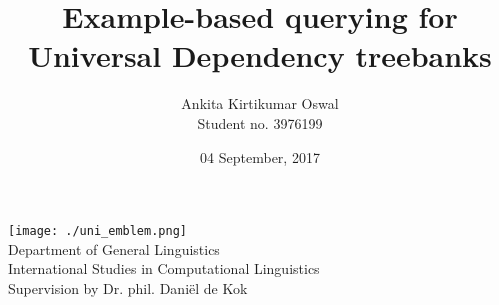 \documentclass[]{scrartcl}
\theoremstyle{exmp}
\begin{document}
\setlength{\parindent}{0pt} %
\clearpage

\begin{titlepage}
	\author{Ankita Kirtikumar Oswal\\Student no. 3976199}
	\title{Example-based querying for Universal Dependency treebanks}
	\date{04 September, 2017}
	\maketitle
	\vspace{3cm}
	\centering \texttt{[image: ./uni\_emblem.png]}\\
	\vspace{3cm}
	\large{
		Department of General Linguistics\\
		\vspace{0.5cm}
		International Studies in Computational Linguistics\\
		\vspace{0.5cm}
		Supervision by Dr. phil. Dani\"el de Kok\\
	}
\end{titlepage}

\newpage
\onehalfspacing
\tableofcontents
\singlespacing
\newpage
{} %

\end{document}
